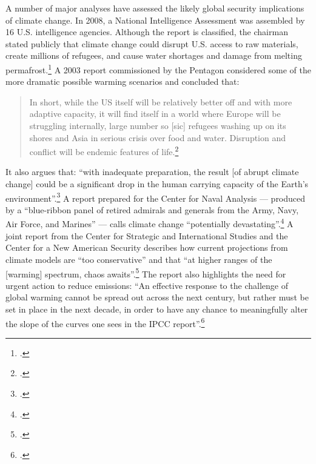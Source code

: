 \documentclass[10pt]{article}
\begin{document}
A number of major analyses have assessed the likely global security implications of climate change.
In 2008, a National Intelligence Assessment was assembled by 16 U.S. intelligence agencies.
Although the report is classified, the chairman stated publicly that climate change could disrupt U.S. access to raw materials, create millions of refugees, and cause water shortages and damage from melting permafrost.\footcite[][]{Craven}
A 2003 report commissioned by the Pentagon considered some of the more dramatic possible warming scenarios and concluded that:
\begin{quote}
In short, while the US itself will be relatively better off and with more adaptive capacity, it will find itself in a world where Europe will be struggling internally, large number so [sic] refugees washing up on its shores and Asia in serious crisis over food and water. Disruption and conflict will be endemic features of life.\footcite[][p. 22]{AbruptCCScenario}
\end{quote}
It also argues that: ``with inadequate preparation, the result [of abrupt climate change] could be a significant drop in the human carrying capacity of the Earth’s environment''.\footcite[][p. 1]{AbruptCCScenario}
A report prepared for the Center for Naval Analysis --- produced by a ``blue-ribbon panel of retired admirals and generals from the Army, Navy, Air Force, and Marines'' --- calls climate change ``potentially devastating''.\footcite[][p. 3]{NationalSecurityCC}
A joint report from the Center for Strategic and International Studies and the Center for a New American Security describes how current projections from climate models are ``too conservative'' and that ``at higher ranges of the [warming] spectrum, chaos awaits''.\footcite[][p. 78]{AgeOfConsequences}
The report also highlights the need for urgent action to reduce emissions: ``An effective response to the challenge of global warming cannot be spread out across the next century, but rather must be set in place in the next decade, in order to have any chance to meaningfully alter the slope of the curves one sees in the IPCC report''.\footcite[][p. 78]{AgeOfConsequences}
\end{document}

